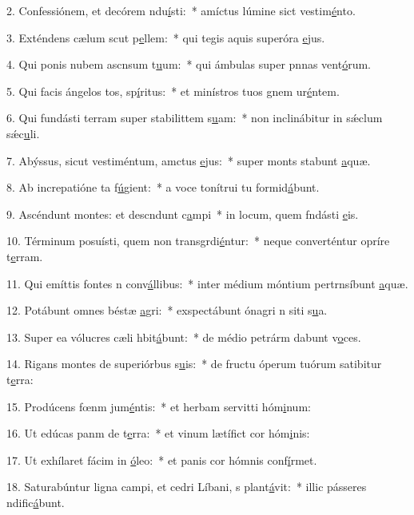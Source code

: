 2. Confessiónem, et decórem ndu\uline{í}sti:~* amíctus lúmine sict vestim\uline{é}nto.\par 
3. Exténdens cælum scut p\uline{e}llem:~* qui tegis aquis superóra \uline{e}jus.\par 
4. Qui ponis nubem ascnsum t\uline{u}um:~* qui ámbulas super pnnas vent\uline{ó}rum.\par 
5. Qui facis ángelos tos, sp\uline{í}ritus:~* et minístros tuos gnem ur\uline{é}ntem.\par 
6. Qui fundásti terram super stabilittem s\uline{u}am:~* non inclinábitur in sǽclum sǽc\uline{u}li.\par 
7. Abýssus, sicut vestiméntum, amctus \uline{e}jus:~* super monts stabunt \uline{a}quæ.\par 
8. Ab increpatióne ta f\uline{ú}gient:~* a voce tonítrui tu formid\uline{á}bunt.\par 
9. Ascéndunt montes: et descndunt c\uline{a}mpi~* in locum, quem fndásti \uline{e}is.\par 
10. Términum posuísti, quem non transgrdi\uline{é}ntur:~* neque converténtur opríre t\uline{e}rram.\par 
11. Qui emíttis fontes n conv\uline{á}llibus:~* inter médium móntium pertrnsíbunt \uline{a}quæ.\par 
12. Potábunt omnes béstæ \uline{a}gri:~* exspectábunt ónagri n siti s\uline{u}a.\par 
13. Super ea vólucres cæli hbit\uline{á}bunt:~* de médio petrárm dabunt v\uline{o}ces.\par 
14. Rigans montes de superiórbus s\uline{u}is:~* de fructu óperum tuórum satibitur t\uline{e}rra:\par 
15. Prodúcens fœnm jum\uline{é}ntis:~* et herbam servitti hóm\uline{i}num:\par 
16. Ut edúcas panm de t\uline{e}rra:~* et vinum lætífict cor hóm\uline{i}nis:\par 
17. Ut exhílaret fácim in \uline{ó}leo:~* et panis cor hómnis conf\uline{í}rmet.\par 
18. Saturabúntur ligna campi, et cedri Líbani, s plant\uline{á}vit:~* illic pásseres ndific\uline{á}bunt.\par 
